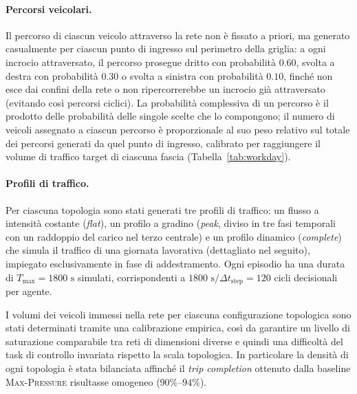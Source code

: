 \paragraph{Percorsi veicolari.}
Il percorso di ciascun veicolo attraverso la rete non è fissato a priori, ma
generato casualmente per ciascun punto di ingresso sul perimetro della
griglia: a ogni incrocio attraversato, il percorso prosegue dritto con
probabilità $0.60$, svolta a destra con probabilità $0.30$ o svolta a
sinistra con probabilità $0.10$, finché non esce dai confini della rete o
non ripercorrerebbe un incrocio già attraversato (evitando così percorsi
ciclici). La probabilità complessiva di un percorso è il prodotto delle
probabilità delle singole scelte che lo compongono; il
numero di veicoli assegnato a ciascun percorso è proporzionale al suo peso relativo
sul totale dei percorsi generati da quel punto di ingresso, calibrato per
raggiungere il volume di traffico target di ciascuna fascia
(Tabella~\ref{tab:workday}).

\paragraph{Profili di traffico.}
Per ciascuna topologia sono stati generati tre profili di traffico:
un flusso a intensità costante (\emph{flat}),
un profilo a gradino (\emph{peak}, diviso in tre fasi temporali con un raddoppio del carico nel terzo centrale) e
un profilo dinamico (\emph{complete}) che simula il traffico di una giornata lavorativa (dettagliato nel seguito), impiegato esclusivamente in fase di addestramento.
Ogni episodio ha una durata di $T_{\text{max}} = 1800 \text{ s}$ simulati, corrispondenti a $1800 \text{ s} / \Delta t_{\text{step}} = 120$ cicli decisionali per agente.

I volumi dei veicoli immessi nella rete per ciascuna configurazione topologica sono stati determinati tramite una calibrazione empirica, così da garantire un livello
di saturazione comparabile tra reti di dimensioni diverse e quindi una difficoltà del task di controllo invariata rispetto la scala topologica.
In particolare la densità di ogni topologia è stata bilanciata affinché il \emph{trip completion} ottenuto dalla baseline \textsc{Max-Pressure} risultasse omogeneo ($90\%\text{--}94\%$).

